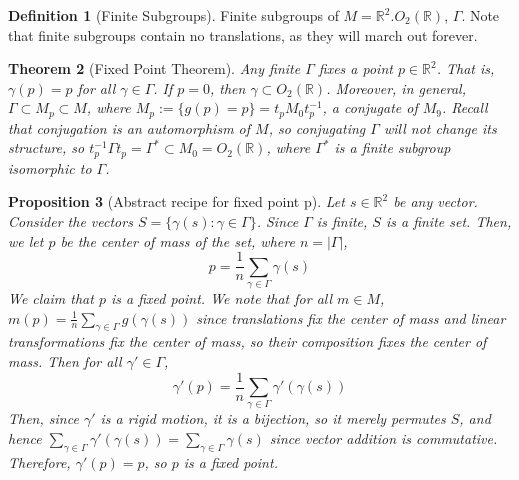 \documentclass[12pt]{article}
\newtheorem{thm}{Theorem}[section]
\newtheorem{prop}[thm]{Proposition}
\theoremstyle{definition}
\newtheorem{defn}[thm]{Definition}
\theoremstyle{remark}
\numberwithin{equation}{section}
\newcommand\R{\mathbb R}    %
\begin{document}
\vspace{15pt}


\begin{defn}[Finite Subgroups]
        Finite subgroups of $M = \R^2.O_2(\R)$, $\Gamma$. Note that finite subgroups contain no translations, as they will march out forever. 
\end{defn}

\vspace{15pt}

\begin{thm}[Fixed Point Theorem]
        Any finite $\Gamma$ fixes a point $p \in \R^2$. That is, $\gamma(p) = p$ for all $\gamma \in \Gamma$. If $p = 0$, then $\gamma \subset O_2(\R)$. Moreover, in general, $\Gamma \subset M_p \subset M$, where $M_p := \{g(p) = p\} = t_pM_0t_p^{-1}$, a conjugate of $M_9$. Recall that conjugation is an automorphism of $M$, so conjugating $\Gamma$ will not change its structure, so $t_p^{-1}\Gamma t_p = \Gamma^* \subset M_0 = O_2(\R)$, where $\Gamma^*$ is a finite subgroup isomorphic to $\Gamma$.
\end{thm}

\begin{prop}[Abstract recipe for fixed point p]
        Let $s \in \R^2$ be any vector. Consider the vectors $S=\{\gamma(s):\gamma \in \Gamma\}$. Since $\Gamma$ is finite, $S$ is a finite set. Then, we let $p$ be the center of mass of the set, where $n = |\Gamma|$, \begin{equation}
                p = \frac{1}{n}\sum\limits_{\gamma \in \Gamma}\gamma(s)
        \end{equation}
        We claim that $p$ is a fixed point. We note that for all $m \in M$, $m(p) = \frac{1}{n}\sum\limits_{\gamma\in\Gamma}g(\gamma(s))$ since translations fix the center of mass and linear transformations fix the center of mass, so their composition fixes the center of mass. Then for all $\gamma' \in \Gamma$, \begin{equation}
                \gamma'(p) = \frac{1}{n}\sum\limits_{\gamma \in \Gamma}\gamma'(\gamma(s))
        \end{equation}
        Then, since $\gamma'$ is a rigid motion, it is a bijection, so it merely permutes $S$, and hence $\sum\limits_{\gamma \in \Gamma}\gamma'(\gamma(s)) = \sum\limits_{\gamma \in \Gamma}\gamma(s)$ since vector addition is commutative. Therefore, $\gamma'(p) = p$, so $p$ is a fixed point. 
\end{prop}

\vspace{15pt}
\end{document}
